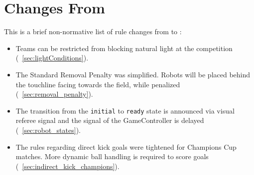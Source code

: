 \section{Changes From \LastRCYear}

This is a brief non-normative list of rule changes from \LastRCYear to \RCYear:
\begin{itemize}
  \item Teams can be restricted from blocking natural light at the competition (\cf~\cref{sec:lightConditions}).
  \item The Standard Removal Penalty was simplified. Robots will be placed behind the touchline facing towards the field, while penalized (\cf~\cref{sec:removal_penalty}).
  \item The transition from the \texttt{initial} to \texttt{ready} state is announced via visual referee signal and the signal of the GameController is delayed (\cf~\cref{sec:robot_states}).
  \item The rules regarding direct kick goals were tightened for Champions Cup matches. More dynamic ball handling is required to score goals (\cf~\cref{sec:indirect_kick_champions}). 
\end{itemize}

